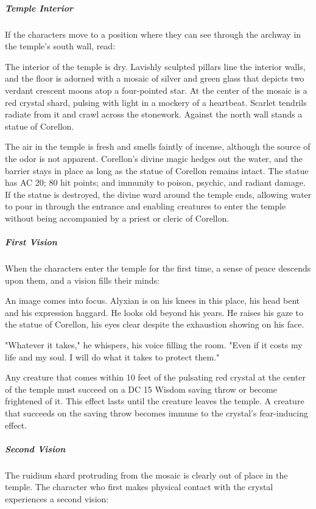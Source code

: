 \documentclass[10pt,a4paper,twoside,bg=print,twocolumn,openany,nodeprecatedcode]{dndbook}
\begin{document}
\subparagraph{Temple Interior}
If the characters move to a position where they can see through the archway in the temple's south wall, read:

\begin{DndReadAloud}{}
The interior of the temple is dry. Lavishly sculpted pillars line the interior walls, and the floor is adorned with a mosaic of silver and green glass that depicts two verdant crescent moons atop a four-pointed star. At the center of the mosaic is a red crystal shard, pulsing with light in a mockery of a heartbeat. Scarlet tendrils radiate from it and crawl across the stonework. Against the north wall stands a statue of Corellon.

\end{DndReadAloud}

The air in the temple is fresh and smells faintly of incense, although the source of the odor is not apparent. Corellon's divine magic hedges out the water, and the barrier stays in place as long as the statue of Corellon remains intact. The statue has AC 20; 80 hit points; and immunity to poison, psychic, and radiant damage. If the statue is destroyed, the divine ward around the temple ends, allowing water to pour in through the entrance and enabling creatures to enter the temple without being accompanied by a priest or cleric of Corellon.

\subparagraph{First Vision}
When the characters enter the temple for the first time, a sense of peace descends upon them, and a vision fills their minds:

\begin{DndReadAloud}{}
An image comes into focus. Alyxian is on his knees in this place, his head bent and his expression haggard. He looks old beyond his years. He raises his gaze to the statue of Corellon, his eyes clear despite the exhaustion showing on his face.

"Whatever it takes," he whispers, his voice filling the room. "Even if it costs my life and my soul. I will do what it takes to protect them."

\end{DndReadAloud}

Any creature that comes within 10 feet of the pulsating red crystal at the center of the temple must succeed on a DC 15 Wisdom saving throw or become frightened of it. This effect lasts until the creature leaves the temple. A creature that succeeds on the saving throw becomes immune to the crystal's fear-inducing effect.

\subparagraph{Second Vision}
The ruidium shard protruding from the mosaic is clearly out of place in the temple. The character who first makes physical contact with the crystal experiences a second vision:
\end{document}
